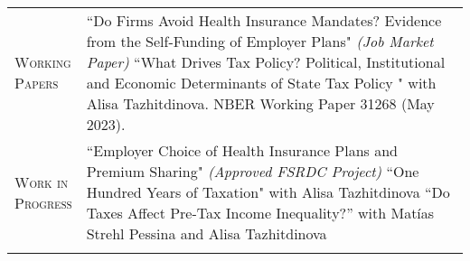 \documentclass[11pt]{article}
\newcommand{\xspace}{23pt}
\begin{document}
\begin{tabularx}{\textwidth}{@{}Y Z@{}}
	\textsc{Working \newline Papers} & 
	``Do Firms Avoid Health Insurance Mandates? Evidence from the Self-Funding \newline of Employer Plans"  \textit{(Job Market Paper)}
	\vspace{10pt} \newline
	``What Drives Tax Policy? Political, Institutional and Economic Determinants of \newline State Tax Policy " with Alisa Tazhitdinova. NBER Working Paper 31268 (May 2023).
     \\ \addlinespace[\xspace] 
    
    \textsc{Work in \newline Progress}  & 
    ``Employer Choice of Health Insurance Plans and Premium Sharing"
    \newline \textit{(Approved FSRDC Project)}
    \vspace{10pt} \newline
    ``One Hundred Years of Taxation" with Alisa Tazhitdinova
    \vspace{10pt} \newline
    “Do Taxes Affect Pre-Tax Income Inequality?” with Matías Strehl Pessina and \newline Alisa Tazhitdinova
     \\ \addlinespace[\xspace] 


\end{tabularx}
\end{document}
